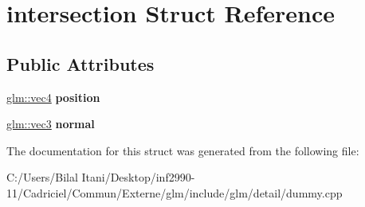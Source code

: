 \hypertarget{structintersection}{}\section{intersection Struct Reference}
\label{structintersection}
\subsection*{Public Attributes}
\begin{DoxyCompactItemize}
\item 
\hyperlink{group__core__types_ga5881b1b022d7fd1b7218f5916532dd02}{glm\+::vec4} {\bfseries position}\hypertarget{structintersection_a7a33f425d759e3e1240499a7f527b914}{}\label{structintersection_a7a33f425d759e3e1240499a7f527b914}

\item 
\hyperlink{group__core__types_ga1c47e8b3386109bc992b6c48e91b0be7}{glm\+::vec3} {\bfseries normal}\hypertarget{structintersection_a4db60aeaf032905a89ca8382914b44e4}{}\label{structintersection_a4db60aeaf032905a89ca8382914b44e4}

\end{DoxyCompactItemize}


The documentation for this struct was generated from the following file\+:\begin{DoxyCompactItemize}
\item 
C\+:/\+Users/\+Bilal Itani/\+Desktop/inf2990-\/11/\+Cadriciel/\+Commun/\+Externe/glm/include/glm/detail/dummy.\+cpp\end{DoxyCompactItemize}
